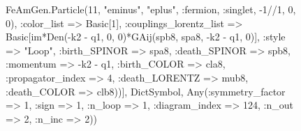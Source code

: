 \documentclass{revtex4}
\begin{document}
\begin{figure}[!htb]
\begin{center}
{FeAmGen.Particle(11, "eminus", "eplus", :fermion, :singlet, -1//1, 0, 0), :color_list => Basic[1], :couplings_lorentz_list => Basic[im*Den(-k2 - q1, 0, 0)*GAij(spb8, spa8, -k2 - q1, 0)], :style => "Loop", :birth_SPINOR => spa8, :death_SPINOR => spb8, :momentum => -k2 - q1, :birth_COLOR => cla8, :propagator_index => 4, :death_LORENTZ => mub8, :death_COLOR => clb8))], Dict{Symbol, Any}(:symmetry_factor => 1, :sign => 1, :n_loop => 1, :diagram_index => 124, :n_out => 2, :n_inc => 2)) 
}
\end{center}
\end{figure}
\end{document}
